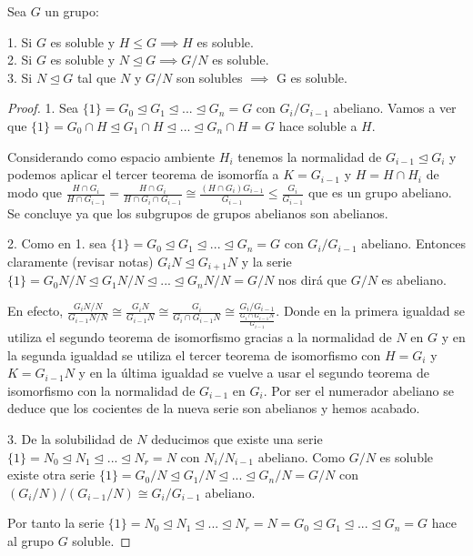 \begin{proposition}
Sea $G$ un grupo:

1. Si $G$ es soluble y $H \le G \implies H$ es soluble.\\
2. Si $G$ es soluble y $N \trianglelefteq G \implies G/N$ es soluble.\\
3. Si $N \trianglelefteq G$ tal que $N$ y $G/N$ son solubles $\implies$ G es soluble.
\end{proposition}
\begin{proof}
1. Sea $\{1\} = G_0 \trianglelefteq G_1 \trianglelefteq ... \trianglelefteq G_n = G$ con $G_i/G_{i-1}$ abeliano. Vamos a ver que $\{1\} = G_0 \cap H \trianglelefteq G_1 \cap H \trianglelefteq ... \trianglelefteq G_n \cap H= G$ hace soluble a $H$.

Considerando como espacio ambiente $H_i$ tenemos la normalidad de $G_{i-1} \trianglelefteq G_i$ y podemos aplicar el tercer teorema de isomorfía a $K = G_{i-1}$ y $H = H \cap H_i$ de modo que $\frac{H \cap G_i}{H \cap G_{i-1}} = \frac{H \cap G_i}{H \cap G_{i} \cap G_{i-1}} \cong \frac{(H \cap G_i)G_{i-1}}{G_{i-1}} \le \frac{G_i}{G_{i-1}}$ que es un grupo abeliano. Se concluye ya que los subgrupos de grupos abelianos son abelianos.

2. Como en 1. sea $\{1\} = G_0 \trianglelefteq G_1 \trianglelefteq ... \trianglelefteq G_n = G$ con $G_i/G_{i-1}$ abeliano. Entonces claramente (revisar notas) $G_iN \trianglelefteq G_{i+1}N$ y la serie $\{1\} = G_0N/N \trianglelefteq G_1N/N \trianglelefteq ... \trianglelefteq G_nN/N = G/N$ nos dirá que $G/N$ es abeliano.

En efecto, $\frac{G_iN/N}{G_{i-1}N/N} \cong \frac{G_iN}{G_{i-1}N} \cong \frac{G_i}{G_i \cap G_{i-1}N} \cong \frac{G_i/G_{i-1}}{\frac{G_i \cap G_{i-1}N}{G_{i-1}}}$. Donde en la primera igualdad se utiliza el segundo teorema de isomorfismo gracias a la normalidad de $N$ en $G$ y en la segunda igualdad se utiliza el tercer teorema de isomorfismo con $H = G_{i}$ y $K = G_{i-1}N$ y en la última igualdad se vuelve a usar el segundo teorema de isomorfismo con la normalidad de $G_{i-1}$ en $G_i$. Por ser el numerador abeliano se deduce que los cocientes de la nueva serie son abelianos y hemos acabado.

3. De la solubilidad de $N$ deducimos que existe una serie $\{1\} = N_0 \trianglelefteq N_1 \trianglelefteq ... \trianglelefteq N_r = N$ con $N_i/N_{i-1}$ abeliano. Como $G/N$ es soluble existe otra serie $\{1\} = G_0/N \trianglelefteq G_1/N \trianglelefteq ... \trianglelefteq G_n/N = G/N$ con $(G_i/N)/(G_{i-1}/N) \cong G_i/G_{i-1}$ abeliano.

Por tanto la serie $\{1\} = N_0 \trianglelefteq N_1 \trianglelefteq ... \trianglelefteq N_r = N = G_0 \trianglelefteq G_1 \trianglelefteq ... \trianglelefteq G_n = G$ hace al grupo $G$ soluble.
\end{proof}

